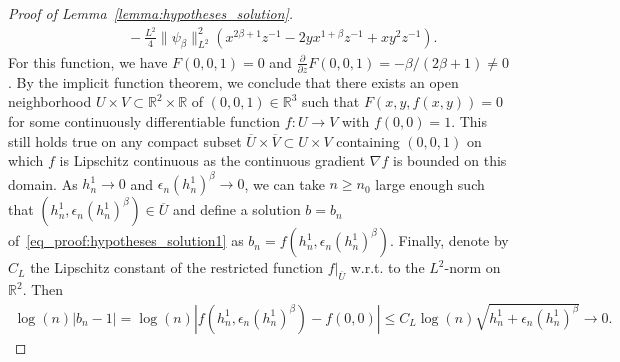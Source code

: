 \documentclass[10pt,a4paper]{amsart}
\newcommand{\R}{\mathbb{R}}
\begin{document}
\begin{proof}[Proof of Lemma~\ref{lemma:hypotheses_solution}]
\begin{align*}
        &\hspace{1cm} -\frac{L^2}{4}\|\psi_\beta\|_{L^2}^2\left( x^{2\beta+1}z^{-1} - 2yx^{1+\beta}z^{-1} + xy^2z^{-1}\right).
    \end{align*}
    For this function, we have $F(0,0,1)=0$ and $\frac{\partial}{\partial z}F(0,0,1)=-\beta/(2\beta+1)\neq 0$. By the implicit function theorem, we conclude that there exists an open neighborhood $U\times V\subset\R^2\times \R$ of $(0,0,1)\in\R^3$ such that $F(x,y,f(x,y))=0$ for some continuously differentiable function $f:U\rightarrow V$ with $f(0,0)=1$. This still holds true on any compact subset $\overline{U}\times \overline{V}\subset U\times V$ containing $(0,0,1)$ on which $f$ is Lipschitz continuous as the continuous gradient $\nabla f$ is bounded on this domain. As $h_n^1\rightarrow 0$ and $\epsilon_n (h_n^1)^\beta\rightarrow 0$, we can take $n\geq n_0$ large enough such that $(h_n^1, \epsilon_n(h_n^1)^\beta)\in \overline{U}$ and define a solution $b=b_n$ of~\eqref{eq_proof:hypotheses_solution1} as $b_n=f(h_n^1,\epsilon_n (h_n^1)^\beta)$. Finally, denote by $C_L$ the Lipschitz constant of the restricted function $f|_{\overline{U}}$ w.r.t. to the $L^2$-norm on $\R^2$. Then
    \begin{align*}
        \log(n) \left| b_n-1\right| = \log(n)\left| f(h_n^1, \epsilon_n(h_n^1)^\beta) - f(0,0)\right| \leq C_L\log(n)\sqrt{ h_n^1 + \epsilon_n(h_n^1)^\beta} \rightarrow 0.
    \end{align*}
\end{proof}
\end{document}

